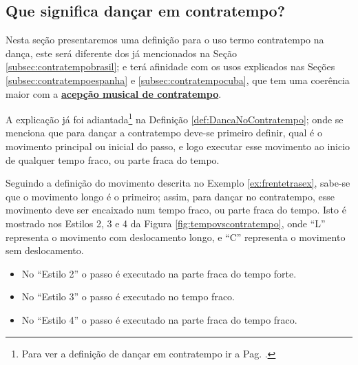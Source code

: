 \subsection{Que significa dançar em contratempo?}
Nesta seção presentaremos uma definição para o uso termo contratempo na dança,
este será diferente dos já mencionados na Seção \ref{subsec:contratempobrasil};
e terá afinidade  com os usos explicados nas 
Seções \ref{subsec:contratempoespanha} e \ref{subsec:contratempocuba},
que tem uma coerência maior com a \hyperref[sec:contratempo]{\textbf{acepção musical de contratempo}}.

A explicação já foi adiantada\footnote{Para 
ver a definição de dançar em contratempo ir a Pag. \pageref{def:DancaNoContratempo}.}
 na Definição \ref{def:DancaNoContratempo};
onde se menciona que para dançar a contratempo deve-se primeiro definir,
 qual é o movimento principal ou inicial do passo,
e logo executar esse movimento ao inicio de qualquer tempo fraco, ou parte fraca do tempo.

\begin{example}
Seguindo a definição do movimento descrita no Exemplo \ref{ex:frentetrasex},
sabe-se que o movimento longo é o primeiro;
assim, para dançar no contratempo, esse movimento deve ser encaixado num tempo fraco,
ou parte fraca do tempo.
Isto é mostrado nos Estilos 2, 3 e 4 da Figura \ref{fig:tempovscontratempo},
onde ``L'' representa o movimento com deslocamento longo,
e ``C'' representa o movimento sem deslocamento.
\begin{itemize} 
\item No ``Estilo 2'' o passo é executado na parte fraca do tempo forte.
\item No ``Estilo 3'' o passo é executado no tempo fraco.
\item No ``Estilo 4'' o passo é executado na parte fraca do tempo fraco.
\end{itemize}
\end{example}
